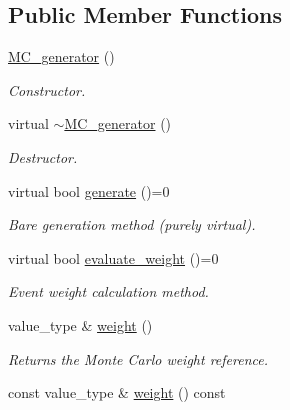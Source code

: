 \subsection*{Public Member Functions}
\begin{DoxyCompactItemize}
\item 
\hypertarget{a00366_a8d50bbf51d222365ff5fb023ff67c2b3}{}\hyperlink{a00366_a8d50bbf51d222365ff5fb023ff67c2b3}{M\+C\+\_\+generator} ()\label{a00366_a8d50bbf51d222365ff5fb023ff67c2b3}

\begin{DoxyCompactList}\small\item\em Constructor. \end{DoxyCompactList}\item 
\hypertarget{a00366_aef838e5722046a65dd68ea9737c6c8e9}{}virtual \hyperlink{a00366_aef838e5722046a65dd68ea9737c6c8e9}{$\sim$\+M\+C\+\_\+generator} ()\label{a00366_aef838e5722046a65dd68ea9737c6c8e9}

\begin{DoxyCompactList}\small\item\em Destructor. \end{DoxyCompactList}\item 
virtual bool \hyperlink{a00366_a197b7bb66d8de5f6de401f81bea71e6c}{generate} ()=0
\begin{DoxyCompactList}\small\item\em \textquotesingle{}Bare generation\textquotesingle{} method (purely virtual). \end{DoxyCompactList}\item 
\hypertarget{a00366_a0eb3cb6ba8fb5a5c29817e12fbb1519c}{}virtual bool \hyperlink{a00366_a0eb3cb6ba8fb5a5c29817e12fbb1519c}{evaluate\+\_\+weight} ()=0\label{a00366_a0eb3cb6ba8fb5a5c29817e12fbb1519c}

\begin{DoxyCompactList}\small\item\em Event weight calculation method. \end{DoxyCompactList}\item 
\hypertarget{a00366_a0d7267239ddb11ae5c4eb5df1282c163}{}value\+\_\+type \& \hyperlink{a00366_a0d7267239ddb11ae5c4eb5df1282c163}{weight} ()\label{a00366_a0d7267239ddb11ae5c4eb5df1282c163}

\begin{DoxyCompactList}\small\item\em Returns the Monte Carlo weight reference. \end{DoxyCompactList}\item 
\hypertarget{a00366_a32830d678911518e504ebd08a5a111b8}{}const value\+\_\+type \& \hyperlink{a00366_a32830d678911518e504ebd08a5a111b8}{weight} () const \label{a00366_a32830d678911518e504ebd08a5a111b8}


\end{DoxyCompactItemize}
